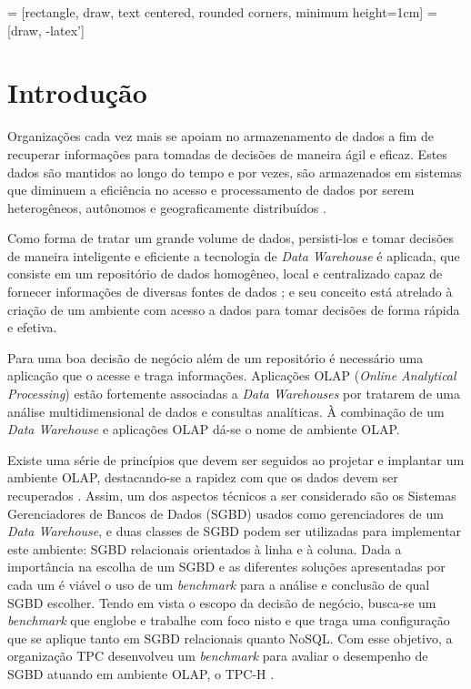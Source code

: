 \documentclass[conference]{IEEEtran}
\begin{document}
\IEEEpeerreviewmaketitle

 = [rectangle, draw, 
    text centered, rounded corners, minimum height=1cm]
 = [draw, -latex']


\section{Introdução}

Organizações cada vez mais se apoiam no armazenamento de dados a fim de recuperar informações para tomadas de decisões de maneira ágil e eficaz. Estes dados são mantidos ao longo do tempo e por vezes, são armazenados em sistemas que diminuem a eficiência no acesso e processamento de dados por serem heterogêneos, autônomos e geograficamente distribuídos \cite{wrembel2007data}.

Como forma de tratar um grande volume de dados, persisti-los e tomar decisões de maneira inteligente e eficiente a tecnologia de \textit{Data Warehouse} é aplicada, que consiste em um repositório de dados homogêneo, local e centralizado capaz de fornecer informações de diversas fontes de dados \cite{wrembel2007data}; e seu conceito está atrelado à criação de um ambiente com acesso a dados para tomar decisões de forma rápida e efetiva.

Para uma boa decisão de negócio além de um repositório é necessário uma aplicação que o acesse e traga informações. Aplicações OLAP (\textit{Online Analytical Processing}) estão fortemente associadas a \textit{Data Warehouses} por tratarem de uma análise multidimensional de dados e consultas analíticas. À combinação de um \textit{Data Warehouse} e aplicações OLAP dá-se o nome de ambiente OLAP.

Existe uma série de princípios que devem ser seguidos ao projetar e implantar um ambiente OLAP, destacando-se a rapidez com que os dados devem ser recuperados \cite{codd1998providing, kimball2002dw, wrembel2007data}. Assim, um dos aspectos técnicos a ser considerado são os Sistemas Gerenciadores de Bancos de Dados (SGBD) usados como gerenciadores de um \textit{Data Warehouse}, e duas classes de SGBD podem ser utilizadas para implementar este ambiente: SGBD relacionais orientados à linha e à coluna. Dada a importância na escolha de um SGBD e as diferentes soluções apresentadas por cada um é viável o uso de um \textit{benchmark} para a análise e conclusão de qual SGBD escolher. Tendo em vista o escopo da decisão de negócio, busca-se um \textit{benchmark} que englobe e trabalhe com foco nisto e que traga uma configuração que se aplique tanto em SGBD relacionais quanto NoSQL. Com esse objetivo, a organização TPC \cite{tpc2017page} desenvolveu um \textit{benchmark} para avaliar o desempenho de SGBD atuando em ambiente OLAP, o TPC-H \cite{tpch2017page}. 
\end{document}
